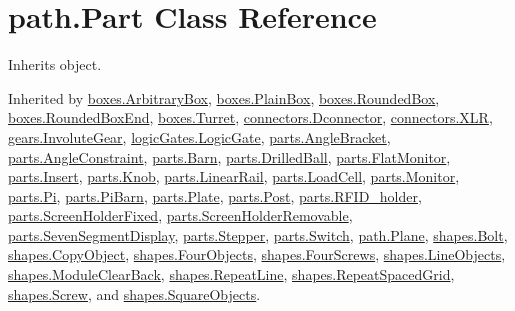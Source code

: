 \hypertarget{classpath_1_1_part}{}\section{path.\+Part Class Reference}
\label{classpath_1_1_part}


Inherits object.



Inherited by \hyperlink{classboxes_1_1_arbitrary_box}{boxes.\+Arbitrary\+Box}, \hyperlink{classboxes_1_1_plain_box}{boxes.\+Plain\+Box}, \hyperlink{classboxes_1_1_rounded_box}{boxes.\+Rounded\+Box}, \hyperlink{classboxes_1_1_rounded_box_end}{boxes.\+Rounded\+Box\+End}, \hyperlink{classboxes_1_1_turret}{boxes.\+Turret}, \hyperlink{classconnectors_1_1_dconnector}{connectors.\+Dconnector}, \hyperlink{classconnectors_1_1_x_l_r}{connectors.\+X\+L\+R}, \hyperlink{classgears_1_1_involute_gear}{gears.\+Involute\+Gear}, \hyperlink{classlogic_gates_1_1_logic_gate}{logic\+Gates.\+Logic\+Gate}, \hyperlink{classparts_1_1_angle_bracket}{parts.\+Angle\+Bracket}, \hyperlink{classparts_1_1_angle_constraint}{parts.\+Angle\+Constraint}, \hyperlink{classparts_1_1_barn}{parts.\+Barn}, \hyperlink{classparts_1_1_drilled_ball}{parts.\+Drilled\+Ball}, \hyperlink{classparts_1_1_flat_monitor}{parts.\+Flat\+Monitor}, \hyperlink{classparts_1_1_insert}{parts.\+Insert}, \hyperlink{classparts_1_1_knob}{parts.\+Knob}, \hyperlink{classparts_1_1_linear_rail}{parts.\+Linear\+Rail}, \hyperlink{classparts_1_1_load_cell}{parts.\+Load\+Cell}, \hyperlink{classparts_1_1_monitor}{parts.\+Monitor}, \hyperlink{classparts_1_1_pi}{parts.\+Pi}, \hyperlink{classparts_1_1_pi_barn}{parts.\+Pi\+Barn}, \hyperlink{classparts_1_1_plate}{parts.\+Plate}, \hyperlink{classparts_1_1_post}{parts.\+Post}, \hyperlink{classparts_1_1_r_f_i_d__holder}{parts.\+R\+F\+I\+D\+\_\+holder}, \hyperlink{classparts_1_1_screen_holder_fixed}{parts.\+Screen\+Holder\+Fixed}, \hyperlink{classparts_1_1_screen_holder_removable}{parts.\+Screen\+Holder\+Removable}, \hyperlink{classparts_1_1_seven_segment_display}{parts.\+Seven\+Segment\+Display}, \hyperlink{classparts_1_1_stepper}{parts.\+Stepper}, \hyperlink{classparts_1_1_switch}{parts.\+Switch}, \hyperlink{classpath_1_1_plane}{path.\+Plane}, \hyperlink{classshapes_1_1_bolt}{shapes.\+Bolt}, \hyperlink{classshapes_1_1_copy_object}{shapes.\+Copy\+Object}, \hyperlink{classshapes_1_1_four_objects}{shapes.\+Four\+Objects}, \hyperlink{classshapes_1_1_four_screws}{shapes.\+Four\+Screws}, \hyperlink{classshapes_1_1_line_objects}{shapes.\+Line\+Objects}, \hyperlink{classshapes_1_1_module_clear_back}{shapes.\+Module\+Clear\+Back}, \hyperlink{classshapes_1_1_repeat_line}{shapes.\+Repeat\+Line}, \hyperlink{classshapes_1_1_repeat_spaced_grid}{shapes.\+Repeat\+Spaced\+Grid}, \hyperlink{classshapes_1_1_screw}{shapes.\+Screw}, and \hyperlink{classshapes_1_1_square_objects}{shapes.\+Square\+Objects}.

